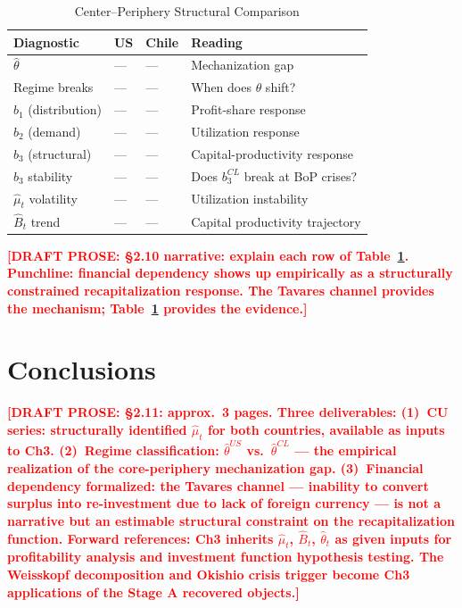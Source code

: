 \documentclass[12pt,letterpaper]{article}
\newcommand{\draftnote}[1]{%
  \textcolor{red}{\textbf{[DRAFT PROSE: #1]}}}
\begin{document}
\begin{table}[h]
  \centering
  \caption{Center--Periphery Structural Comparison}
  \label{tab:comparison}
  \begin{tabular}{llll}
    \toprule
    Diagnostic & US & Chile & Reading \\
    \midrule
    $\hat{\theta}$               & --- & --- & Mechanization gap \\
    Regime breaks                & --- & --- & When does $\theta$ shift? \\
    $b_1$ (distribution)         & --- & --- & Profit-share response \\
    $b_2$ (demand)               & --- & --- & Utilization response \\
    $b_3$ (structural)           & --- & --- & Capital-productivity response \\
    $b_3$ stability              & --- & --- & Does $b_3^{CL}$ break at BoP crises? \\
    $\widehat{\mu}_t$ volatility & --- & --- & Utilization instability \\
    $\hat{B}_t$ trend            & --- & --- & Capital productivity trajectory \\
    \bottomrule
  \end{tabular}
  \bigskip

\end{table}

\draftnote{§2.10 narrative: explain each row of Table~\ref{tab:comparison}.
  Punchline: financial dependency shows up empirically as a structurally
  constrained recapitalization response. The Tavares channel provides the
  mechanism; Table~\ref{tab:comparison} provides the evidence.}


\section{Conclusions}
\label{sec:conclusions}

\draftnote{§2.11: approx.\ 3 pages. Three deliverables:
  (1)~CU series: structurally identified $\hat{\mu}_t$ for both countries,
  available as inputs to Ch3.
  (2)~Regime classification: $\hat{\theta}^{US}$ vs.\ $\hat{\theta}^{CL}$
  — the empirical realization of the core-periphery mechanization gap.
  (3)~Financial dependency formalized: the Tavares channel — inability to
  convert surplus into re-investment due to lack of foreign currency —
  is not a narrative but an estimable structural constraint on the
  recapitalization function.
  Forward references: Ch3 inherits $\hat{\mu}_t$, $\hat{B}_t$, $\hat{\theta}_t$
  as given inputs for profitability analysis and investment function
  hypothesis testing. The Weisskopf decomposition and Okishio crisis
  trigger become Ch3 applications of the Stage A recovered objects.}
\end{document}
